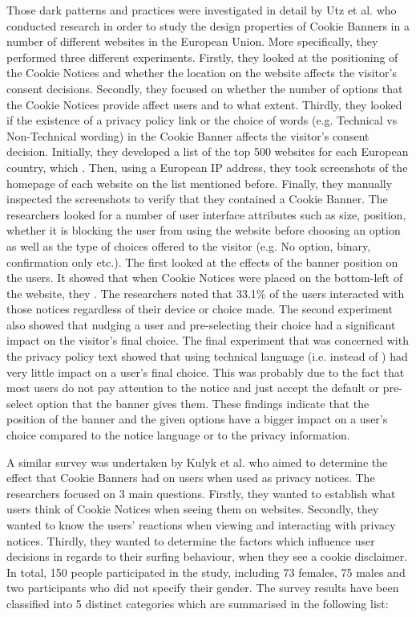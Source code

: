\documentclass[../main.tex]{subfiles}
\begin{document}
Those dark patterns and practices were investigated in detail by Utz et al. \cite{utz2019informed} who conducted research in order to study the design properties of Cookie Banners in a number of different websites in the European Union. More specifically, they performed three different experiments. Firstly, they looked at the positioning of the Cookie Notices and whether the location on the website affects the visitor’s consent decisions. Secondly, they focused on whether the number of options that the Cookie Notices provide affect users and to what extent. Thirdly, they looked if the existence of a privacy policy link or the choice of words (e.g. Technical vs Non-Technical wording) in the Cookie Banner affects the visitor’s consent decision. Initially, they developed a list of the top 500 websites for each European country, which . Then, using a European IP address, they took screenshots of the homepage of each website on the list mentioned before. Finally, they manually inspected the screenshots to verify that they contained a Cookie Banner. The researchers looked for a number of user interface attributes such as size, position, whether it is blocking the user from using the website before choosing an option as well as the type of choices offered to the visitor (e.g. No option, binary, confirmation only etc.). The first looked at the effects of the banner position on the users. It showed that when Cookie Notices were placed on the bottom-left of the website, they . The researchers noted that 33.1\% of the users interacted with those notices regardless of their device or choice made. The second experiment also showed that nudging a user and pre-selecting their choice had a significant impact on the visitor’s final choice. The final experiment that was concerned with the privacy policy text showed that using technical language (i.e.  instead of ) had very little impact on a user’s final choice. This was probably due to the fact that most users do not pay attention to the notice and just accept the default or pre-select option that the banner gives them. These findings indicate that the position of the banner and the given options have a bigger impact on a user’s choice compared to the notice language or to the privacy information. 

A similar survey was undertaken by Kulyk et al. \cite{kulyk2018website} who aimed to determine the effect that Cookie Banners had on users when used as privacy notices. The researchers focused on 3 main questions. Firstly, they wanted to establish what users think of Cookie Notices when seeing them on websites. Secondly, they wanted to know the users’ reactions when viewing and interacting with privacy notices. Thirdly, they wanted to determine the factors which influence user decisions in regards to their surfing behaviour, when they see a cookie disclaimer. In total, 150 people participated in the study, including 73 females, 75 males and two participants who did not specify their gender. The survey results have been classified into 5 distinct categories which are summarised in the following list:
\end{document}
